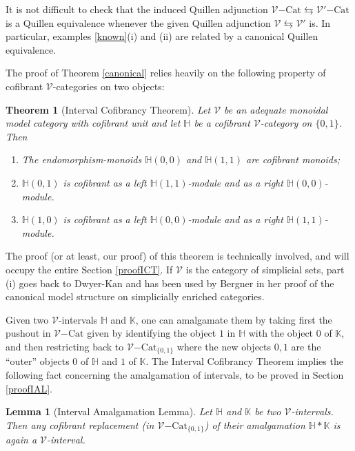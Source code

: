 \documentclass[10pt]{amsart}
\theoremstyle{plain}
\newtheorem{thm}[subsection]{Theorem}
\newtheorem{lma}[subsection]{Lemma}
\theoremstyle{remark}
\def\Vv{\mathcal{V}}
\def\Cat{\mathrm{Cat}}
\def\VCat{\Vv\mathrm{-}\Cat}
\def\V'Cat{\Vv'\mathrm{-}\Cat}
\def\HH{\mathbb{H}}
\def\KK{\mathbb{K}}
\def\lra{\leftrightarrows}
\begin{document}
It is not difficult to check that the induced Quillen adjunction $\VCat\lra\V'Cat$ is a Quillen equivalence whenever the given Quillen adjunction $\Vv\lra\Vv'$ is. In particular, examples \ref{known}(i) and (ii) are related by a canonical Quillen equivalence.\vspace{1ex}

The proof of Theorem \ref{canonical} relies heavily on the following property of cofibrant $\Vv$-categories on two objects:

\begin{thm}[Interval Cofibrancy Theorem]\label{cofibrant}Let $\Vv$ be an adequate monoidal model category with cofibrant unit and let $\HH$ be a cofibrant $\Vv$-category on $\{0,1\}$. Then

\begin{enumerate}\item[(i)]The endomorphism-monoids $\HH(0,0)$ and $\HH(1,1)$ are cofibrant monoids;
\item[(ii)]$\HH(0,1)$ is cofibrant as a left $\HH(1,1)$-module and as a right $\HH(0,0)$-module.
\item[(iii)]$\HH(1,0)$ is cofibrant as a left $\HH(0,0)$-module and as a right $\HH(1,1)$-module.\end{enumerate}\end{thm}

The proof (or at least, our proof) of this theorem is technically involved, and will occupy the entire Section \ref{proofICT}. If $\Vv$ is the category of simplicial sets, part (i) goes back to Dwyer-Kan \cite{DK2} and has been used by Bergner \cite{Be1} in her proof of the canonical model structure on simplicially enriched categories.

Given two $\Vv$-intervals $\HH$ and $\KK$, one can amalgamate them by taking first the pushout in $\VCat$ given by identifying the object $1$ in $\HH$ with the object $0$ of $\KK$, and then restricting back to $\VCat_{\{0,1\}}$ where the new objects $0,1$ are the ``outer'' objects $0$ of $\HH$ and $1$ of $\KK$. The Interval Cofibrancy Theorem implies the following fact concerning the amalgamation of intervals, to be proved in Section \ref{proofIAL}.

\begin{lma}[Interval Amalgamation Lemma]\label{IAL}Let $\HH$ and $\KK$ be two $\Vv$-intervals. Then any cofibrant replacement (in $\VCat_{\{0,1\}}$) of their amalgamation $\HH*\KK$ is again a $\Vv$-interval.\end{lma}
\end{document}
